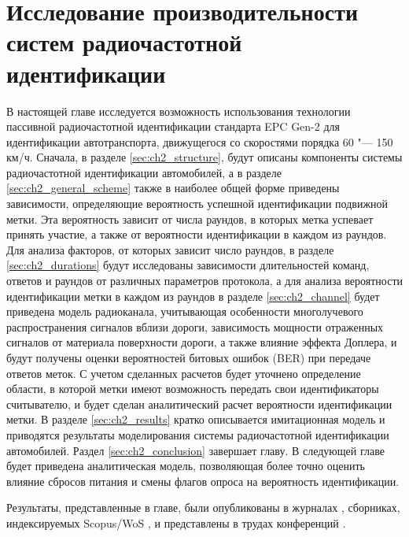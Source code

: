 \chapter{Исследование производительности систем радиочастотной идентификации}\label{ch:ch2}

В настоящей главе исследуется возможность использования технологии пассивной радиочастотной идентификации стандарта EPC Gen-2 \cite{StdGen2} для идентификации автотранспорта, движущегося со скоростями порядка 60 "--- 150 км/ч. Сначала, в разделе \ref{sec:ch2_structure}, будут описаны компоненты системы радиочастотной идентификации автомобилей, а в разделе \ref{sec:ch2_general_scheme} также в наиболее общей форме приведены зависимости, определяющие вероятность успешной идентификации подвижной метки. Эта вероятность зависит от числа раундов, в которых метка успевает принять участие, а также от вероятности идентификации в каждом из раундов. Для анализа факторов, от которых зависит число раундов, в разделе \ref{sec:ch2_durations} будут исследованы зависимости длительностей команд, ответов и раундов от различных параметров протокола, а для анализа вероятности идентификации метки в каждом из раундов в разделе \ref{sec:ch2_channel} будет приведена модель радиоканала, учитывающая особенности многолучевого распространения сигналов вблизи дороги, зависимость мощности отраженных сигналов от материала поверхности дороги, а также влияние эффекта Доплера, и будут получены оценки вероятностей битовых ошибок (BER) при передаче ответов меток. С учетом сделанных расчетов будет уточнено определение области, в которой метки имеют возможность передать свои идентификаторы считывателю, и будет сделан аналитический расчет вероятности идентификации метки. В разделе \ref{sec:ch2_results} кратко описывается имитационная модель и приводятся результаты моделирования системы радиочастотной идентификации автомобилей. Раздел \ref{sec:ch2_conclusion} завершает главу. В следующей главе будет приведена аналитическая модель, позволяющая более точно оценить влияние сбросов питания и смены флагов опроса на вероятность идентификации.

Результаты, представленные в главе, были опубликованы в журналах \cite{RFID_JRFID2017,QS_TCOMM2012,QS_JITCS2013}, сборниках, индексируемых Scopus/WoS \cite{RFID_IEEERFID2017,RFID_DCCN2016_CCIS,RFID_SYNCHROINFO2018}, и представлены в трудах конференций \cite{Fedotov2020, Fedotov2020a, RFID_DCCN2015_RUS,RFID_DCCN2013_RUS}.





